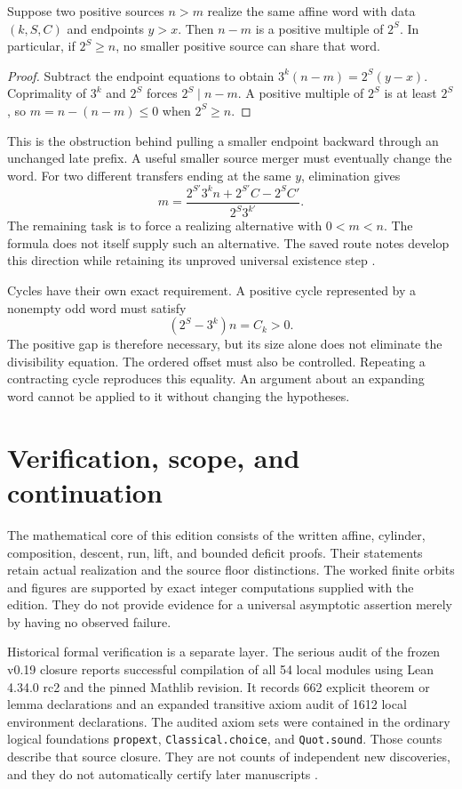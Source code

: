 \begin{proposition}\label{prop:merger}
Suppose two positive sources $n>m$ realize the same affine word with data $(k,S,C)$ and endpoints $y>x$. Then $n-m$ is a positive multiple of $2^S$. In particular, if $2^S\ge n$, no smaller positive source can share that word.
\end{proposition}
\begin{proof}
Subtract the endpoint equations to obtain $3^k(n-m)=2^S(y-x)$. Coprimality of $3^k$ and $2^S$ forces $2^S\mid n-m$. A positive multiple of $2^S$ is at least $2^S$, so $m=n-(n-m)\le0$ when $2^S\ge n$.
\end{proof}

This is the obstruction behind pulling a smaller endpoint backward through an unchanged late prefix. A useful smaller source merger must eventually change the word. For two different transfers ending at the same $y$, elimination gives
\[
m=\frac{2^{S'}3^k n+2^{S'}C-2^S C'}{2^S3^{k'}}.
\]
The remaining task is to force a realizing alternative with $0<m<n$. The formula does not itself supply such an alternative. The saved route notes develop this direction while retaining its unproved universal existence step \cite{projectcollatzroutes}.

Cycles have their own exact requirement. A positive cycle represented by a nonempty odd word must satisfy
\[
(2^S-3^k)n=C_k>0.
\]
The positive gap is therefore necessary, but its size alone does not eliminate the divisibility equation. The ordered offset must also be controlled. Repeating a contracting cycle reproduces this equality. An argument about an expanding word cannot be applied to it without changing the hypotheses.

\section{Verification, scope, and continuation}
The mathematical core of this edition consists of the written affine, cylinder, composition, descent, run, lift, and bounded deficit proofs. Their statements retain actual realization and the source floor distinctions. The worked finite orbits and figures are supported by exact integer computations supplied with the edition. They do not provide evidence for a universal asymptotic assertion merely by having no observed failure.

Historical formal verification is a separate layer. The serious audit of the frozen v0.19 closure reports successful compilation of all 54 local modules using Lean 4.34.0 rc2 and the pinned Mathlib revision. It records 662 explicit theorem or lemma declarations and an expanded transitive axiom audit of 1612 local environment declarations. The audited axiom sets were contained in the ordinary logical foundations \texttt{propext}, \texttt{Classical.choice}, and \texttt{Quot.sound}. Those counts describe that source closure. They are not counts of independent new discoveries, and they do not automatically certify later manuscripts \cite{projectcollatzaudit}.

